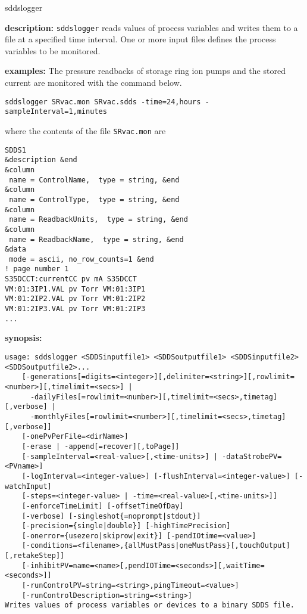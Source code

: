\begin{sddsprog}{sddslogger}
\item \textbf{description:}
\verb+sddslogger+ reads values of process variables and writes them to a file at a specified time interval.
One or more input files defines the process variables to be monitored.
\item \textbf{examples:}
The pressure readbacks of storage ring ion pumps and the stored current are monitored
with the command below.
\begin{verbatim}
sddslogger SRvac.mon SRvac.sdds -time=24,hours -sampleInterval=1,minutes
\end{verbatim}
where the contents of the file \verb+SRvac.mon+ are
\begin{verbatim}
SDDS1
&description &end
&column
 name = ControlName,  type = string, &end
&column
 name = ControlType,  type = string, &end
&column
 name = ReadbackUnits,  type = string, &end
&column
 name = ReadbackName,  type = string, &end
&data
 mode = ascii, no_row_counts=1 &end
! page number 1
S35DCCT:currentCC pv mA S35DCCT
VM:01:3IP1.VAL pv Torr VM:01:3IP1
VM:01:2IP2.VAL pv Torr VM:01:2IP2
VM:01:2IP3.VAL pv Torr VM:01:2IP3
...
\end{verbatim}
\item \textbf{synopsis:}
\begin{verbatim}
usage: sddslogger <SDDSinputfile1> <SDDSoutputfile1> <SDDSinputfile2> <SDDSoutputfile2>...
    [-generations[=digits=<integer>][,delimiter=<string>][,rowlimit=<number>][,timelimit=<secs>] |
      -dailyFiles[=rowlimit=<number>][,timelimit=<secs>,timetag][,verbose] |
      -monthlyFiles[=rowlimit=<number>][,timelimit=<secs>,timetag][,verbose]]
    [-onePvPerFile=<dirName>]
    [-erase | -append[=recover][,toPage]]
    [-sampleInterval=<real-value>[,<time-units>] | -dataStrobePV=<PVname>]
    [-logInterval=<integer-value>] [-flushInterval=<integer-value>] [-watchInput]
    [-steps=<integer-value> | -time=<real-value>[,<time-units>]]
    [-enforceTimeLimit] [-offsetTimeOfDay]
    [-verbose] [-singleshot{=noprompt|stdout}]
    [-precision={single|double}] [-highTimePrecision]
    [-onerror={usezero|skiprow|exit}] [-pendIOtime=<value>]
    [-conditions=<filename>,{allMustPass|oneMustPass}[,touchOutput][,retakeStep]]
    [-inhibitPV=name=<name>[,pendIOTime=<seconds>][,waitTime=<seconds>]]
    [-runControlPV=string=<string>,pingTimeout=<value>]
    [-runControlDescription=string=<string>]
Writes values of process variables or devices to a binary SDDS file.

\end{verbatim}
\end{sddsprog}
